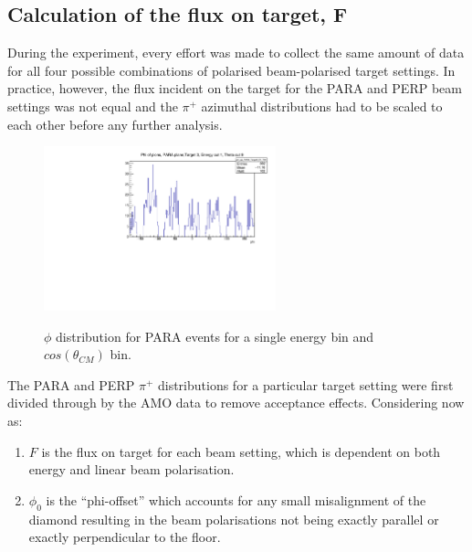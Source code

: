 \subsection{Calculation of the flux on target, F}
During the experiment, every effort was made to collect the same amount of data for all four possible combinations of polarised beam-polarised target settings. In practice, however, the flux incident on the target for the PARA and PERP beam settings was not equal and the $\pi^+$ azimuthal distributions had to be scaled to each other before any further analysis.
\begin{figure}[htb]
  \begin{center}
    \includegraphics[width=0.6\textwidth]{figures/phi_PARA.pdf} \\
    \caption{$\phi$ distribution for PARA events for a single energy bin and $cos(\theta_{CM})$ bin. }
    \label{fig:frost_PARA_ex}
  \end{center}
\end{figure}



The PARA and PERP $\pi^+$ distributions for a particular target setting were first divided through by the AMO data to remove acceptance effects.
Considering now as:
\begin{enumerate}
  \item $F$ is the flux on target for each beam setting, which is dependent on both energy and linear beam polarisation. 
  \item $\phi_0$ is the “phi-offset” which accounts for any small misalignment of the diamond resulting in the beam polarisations not being exactly parallel or exactly perpendicular to the floor.
\end{enumerate}

